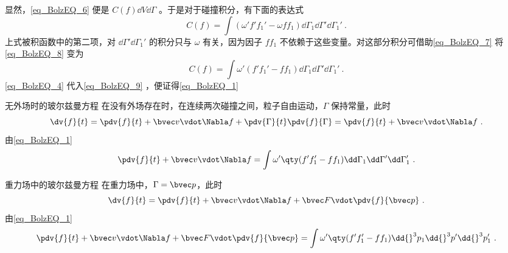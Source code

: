 显然，\autoref{eq_BolzEQ_6} 便是 $C(f)\dd V\dd\Gamma$ 。于是对于碰撞积分，有下面的表达式
\begin{equation}\label{eq_BolzEQ_8}
C(f)=\int(\omega'f'f_1'-\omega f f_1)\dd\Gamma_1\dd\Gamma'\dd\Gamma_1'~.
\end{equation}
上式被积函数中的第二项，对 $\dd\Gamma'\dd\Gamma_1'$ 的积分只与 $\omega$ 有关，因为因子 $ff_1$ 不依赖于这些变量。对这部分积分可借助\autoref{eq_BolzEQ_7} 将\autoref{eq_BolzEQ_8} 变为
\begin{equation}\label{eq_BolzEQ_9}
C(f)=\int\omega'(f'f_1'- f f_1)\dd\Gamma_1\dd\Gamma'\dd\Gamma_1'~.
\end{equation}
\autoref{eq_BolzEQ_4} 代入\autoref{eq_BolzEQ_9} ，便证得\autoref{eq_BolzEQ_1} 
\begin{example}{无外场时的玻尔兹曼方程}
在没有外场存在时，在连续两次碰撞之间，粒子自由运动，$\Gamma$ 保持常量，此时
\begin{equation}
\dv{f}{t}=\pdv{f}{t}+\bvec v\vdot \Nabla f+\pdv{\Gamma}{t}\pdv{f}{\Gamma}=\pdv{f}{t}+\bvec v\vdot \Nabla f~.
\end{equation}
由\autoref{eq_BolzEQ_1} 
\begin{equation}
\pdv{f}{t}+\bvec v\vdot \Nabla f=\int\omega'\qty(f'f_1'-ff_1)\dd\Gamma_1\dd\Gamma'\dd\Gamma_1'~.
\end{equation}
\end{example}
\begin{example}{重力场中的玻尔兹曼方程}
在重力场中，$\Gamma=\bvec p$，此时
\begin{equation}
\dv{f}{t}=\pdv{f}{t}+\bvec v\vdot \Nabla f+\bvec F\vdot\pdv{f}{\bvec p}~.
\end{equation}
由\autoref{eq_BolzEQ_1} 
\begin{equation}
\pdv{f}{t}+\bvec v\vdot \Nabla f+\bvec F\vdot\pdv{f}{\bvec p}=\int\omega'\qty(f'f_1'-ff_1)\dd{}^3  p_1\dd {}^3p'\dd{}^3 p_1'~.
\end{equation}
\end{example}
